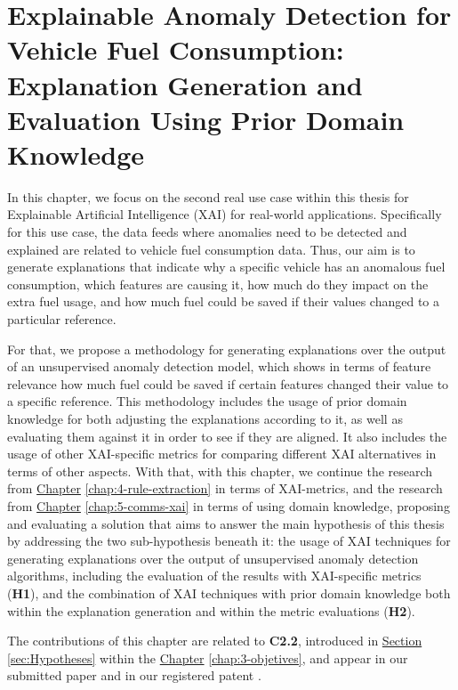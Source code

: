\chapter{Explainable Anomaly Detection for Vehicle Fuel Consumption: Explanation Generation and Evaluation Using Prior Domain Knowledge}\label{chap:6-fleet-xai}

In this chapter, we focus on the second real use case within this thesis for Explainable Artificial Intelligence (XAI) for real-world applications. Specifically for this use case, the data feeds where anomalies need to be detected and explained are related to vehicle fuel consumption data. Thus, our aim is to generate explanations that indicate why a specific vehicle has an anomalous fuel consumption, which features are causing it, how much do they impact on the extra fuel usage, and how much fuel could be saved if their values changed to a particular reference.

For that, we propose a methodology for generating explanations over the output of an unsupervised anomaly detection model, which shows in terms of feature relevance how much fuel could be saved if certain features changed their value to a specific reference. This methodology includes the usage of prior domain knowledge for both adjusting the explanations according to it, as well as evaluating them against it in order to see if they are aligned. It also includes the usage of other XAI-specific metrics for comparing different XAI alternatives in terms of other aspects. With that, with this chapter, we continue the research from \hyperref[chap:4-rule-extraction]{Chapter} \ref{chap:4-rule-extraction} in terms of XAI-metrics, and the research from \hyperref[chap:5-comms-xai]{Chapter} \ref{chap:5-comms-xai} in terms of using domain knowledge, proposing and evaluating a solution that aims to answer the main hypothesis of this thesis by addressing the two sub-hypothesis beneath it: the usage of XAI techniques for generating explanations over the output of unsupervised anomaly detection algorithms, including the evaluation of the results with XAI-specific metrics (\textbf{H1}), and the combination of XAI techniques with prior domain knowledge both within the explanation generation and within the metric evaluations (\textbf{H2}).

The contributions of this chapter are related to \textbf{C2.2}, introduced in \hyperref[sec:Hypotheses]{Section} \ref{sec:Hypotheses} within the \hyperref[chap:3-objetives]{Chapter} \ref{chap:3-objetives}, and appear in our submitted paper \parencite{barbado2021anomaly} and in our registered patent \parencite{patent2020fleet}.

